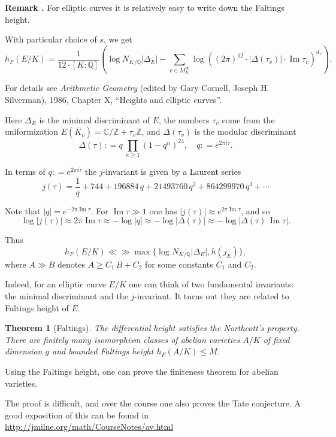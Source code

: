 \documentclass{article}
\newtheorem{theorem}[proposition]{Theorem}
\theoremstyle{definition}
\renewcommand{\Im}{\mathop{\mathrm{Im}}}
\newcommand{\dfn}{\mathrel{\mathop:}=}
\newcommand{\ZZ}{\mathbb{Z}}
\newcommand{\QQ}{\mathbb{Q}}
\newcommand{\CC}{\mathbb{C}}
\newenvironment{remark}
{ \begin{shaded}\begingroup\small\noindent\refstepcounter{proposition}\textbf{Remark \theproposition.} }
{ \endgroup\end{shaded} }
\begin{document}
\begin{remark}
  For elliptic curves it is relatively easy to write down the Faltings height.

  With particular choice of $s$, we get
  $$h_F (E/K) = \frac{1}{12 \cdot [K:\QQ]} \left( \log N_{K/\QQ} |\Delta_E| - \sum_{v\in M_K^\infty} \log ( (2\pi)^{12} \cdot |\Delta (\tau_v)| \cdot \Im \tau_v)^{d_v} \right).$$

  For details see \emph{Arithmetic Geometry} (edited by Gary Cornell, Joseph
  H. Silverman), 1986, Chapter X, ``Heights and elliptic curves''.

  Here $\Delta_E$ is the minimal discriminant of $E$, the numbers $\tau_v$ come
  from the uniformization $E(\overline{K}_v) = \CC/\ZZ + \tau_v\ZZ$, and
  $\Delta (\tau_v)$ is the modular discriminant
  $$\Delta (\tau) \dfn q \, \prod_{n \ge 1} (1 - q^n)^{24}, \quad q \dfn e^{2\pi i\tau}.$$

  In terms of $q \dfn e^{2\pi i\tau}$ the $j$-invariant is given by a Laurent
  series
  $$j(\tau) = \frac{1}{q} + 744 + 196884\,q + 21493760\,q^2 + 864299970\,q^3 + \cdots$$

  Note that $|q| = e^{-2\pi\Im\tau}$. For $\Im \tau \gg 1$ one has
  $|j (\tau)| \approx e^{2\pi\Im\tau}$, and so
  $$\log |j (\tau)| \approx 2\pi\Im\tau \approx -\log |q| \approx -\log |\Delta (\tau)| \approx - \log |\Delta (\tau)\,\Im\tau|.$$

  Thus
  $$h_F (E/K) \ll\gg \max \{ \log N_{K/\QQ} |\Delta_E|, h (j_E) \},$$
  where $A\gg B$ denotes $A \ge C_1 \, B + C_2$ for some constants $C_1$ and
  $C_2$.

  Indeed, for an elliptic curve $E/K$ one can think of two fundamental
  invariants: the minimal discriminant and the $j$-invariant. It turns out they
  are related to Faltings height of $E$.
\end{remark}

\begin{theorem}[Faltings]
  The differential height satisfies the Northcott's property. There are finitely
  many isomorphism classes of abelian varieties $A/K$ of fixed dimension $g$ and
  bounded Faltings height $h_F (A/K) \le M$.
\end{theorem}

Using the Faltings height, one can prove the finiteness theorem for abelian
varieties.

\vspace{1em}

\noindent\frownie\frownie\frownie{} The proof is difficult, and over the course one also proves the Tate conjecture.
A good exposition of this can be found in
\url{http://jmilne.org/math/CourseNotes/av.html}
\end{document}
